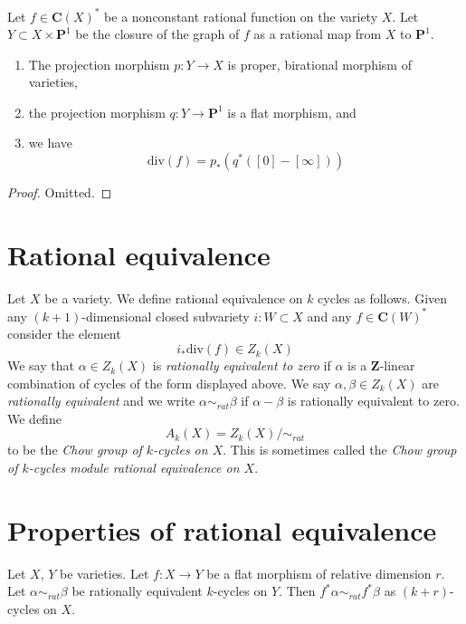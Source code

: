 \begin{lemma}
\label{lemma-rational-function}
Let $f \in \mathbf{C}(X)^*$ be a nonconstant rational function on the
variety $X$. Let $Y \subset X \times \mathbf{P}^1$ be the
closure of the graph of $f$ as a rational map from $X$ to $\mathbf{P}^1$.
\begin{enumerate}
\item The projection morphism $p : Y \to X$ is proper, birational morphism of
varieties,
\item the projection morphism $q : Y \to \mathbf{P}^1$ is a flat morphism,
and
\item we have
$$
\text{div}(f) = p_*(q^*([0] - [\infty]))
$$
\end{enumerate}
\end{lemma}

\begin{proof}
Omitted.
\end{proof}







\section{Rational equivalence}
\label{section-rational-equivalence}

\noindent
Let $X$ be a variety.
We define rational equivalence on $k$ cycles as follows.
Given any $(k + 1)$-dimensional closed subvariety $i : W \subset X$
and any $f \in \mathbf{C}(W)^*$ consider the element
$$
i_*\text{div}(f) \in Z_k(X)
$$
We say that $\alpha \in Z_k(X)$ is {\it rationally equivalent to zero}
if $\alpha$ is a $\mathbf{Z}$-linear combination of cycles of the form
displayed above. We say $\alpha, \beta \in Z_k(X)$ are
{\it rationally equivalent} and we write $\alpha \sim_{rat} \beta$
if $\alpha - \beta$ is rationally equivalent to zero. We define
$$
A_k(X) = Z_k(X) / \sim_{rat}
$$
to be the {\it Chow group of $k$-cycles on $X$}. This is sometimes called
the {\it Chow group of $k$-cycles module rational equivalence on $X$}.



\section{Properties of rational equivalence}
\label{section-properties-rational-equivalence}

\begin{lemma}
\label{lemma-flat-pullback-rational-equivalence}
Let $X$, $Y$ be varieties.
Let $f : X \to Y$ be a flat morphism of relative dimension $r$.
Let $\alpha \sim_{rat} \beta$ be rationally equivalent $k$-cycles on $Y$.
Then $f^*\alpha \sim_{rat} f^*\beta$ as $(k + r)$-cycles on $X$.
\end{lemma}

